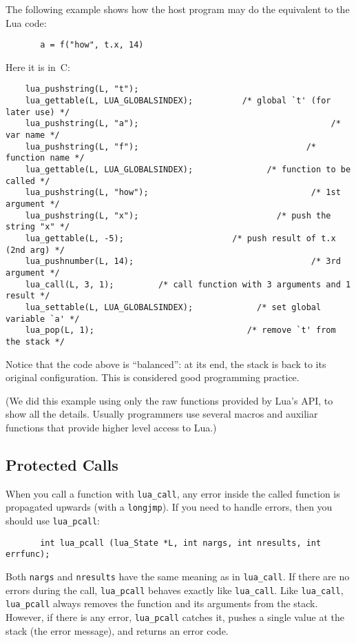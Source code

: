 \documentclass[11pt,twoside,draft]{article}
\begin{document}
The following example shows how the host program may do the
equivalent to the Lua code:
\begin{verbatim}
       a = f("how", t.x, 14)
\end{verbatim}
Here it is in~C:
\begin{verbatim}
    lua_pushstring(L, "t");
    lua_gettable(L, LUA_GLOBALSINDEX);          /* global `t' (for later use) */
    lua_pushstring(L, "a");                                       /* var name */
    lua_pushstring(L, "f");                                  /* function name */
    lua_gettable(L, LUA_GLOBALSINDEX);               /* function to be called */
    lua_pushstring(L, "how");                                 /* 1st argument */
    lua_pushstring(L, "x");                            /* push the string "x" */
    lua_gettable(L, -5);                      /* push result of t.x (2nd arg) */
    lua_pushnumber(L, 14);                                    /* 3rd argument */
    lua_call(L, 3, 1);         /* call function with 3 arguments and 1 result */
    lua_settable(L, LUA_GLOBALSINDEX);             /* set global variable `a' */
    lua_pop(L, 1);                               /* remove `t' from the stack */
\end{verbatim}
Notice that the code above is ``balanced'':
at its end, the stack is back to its original configuration.
This is considered good programming practice.

(We did this example using only the raw functions provided by Lua's API,
to show all the details.
Usually programmers use several macros and auxiliar functions that
provide higher level access to Lua.)


\subsection{Protected Calls}\label{pcall}

When you call a function with \verb|lua_call|,
any error inside the called function is propagated upwards
(with a \verb|longjmp|).
If you need to handle errors,
then you should use \verb|lua_pcall|:
\begin{verbatim}
       int lua_pcall (lua_State *L, int nargs, int nresults, int errfunc);
\end{verbatim}
Both \verb|nargs| and \verb|nresults| have the same meaning as
in \verb|lua_call|.
If there are no errors during the call,
\verb|lua_pcall| behaves exactly like \verb|lua_call|.
Like \verb|lua_call|,
\verb|lua_pcall| always removes the function
and its arguments from the stack.
However, if there is any error,
\verb|lua_pcall| catches it,
pushes a single value at the stack (the error message),
and returns an error code.
\end{document}

